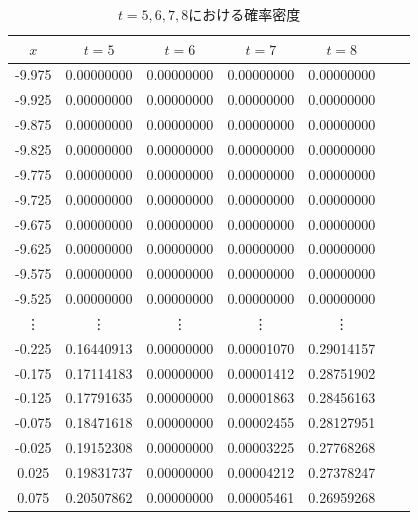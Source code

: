 \documentclass[a4j, titlepage]{jsarticle}
\numberwithin{equation}{section}
\begin{document}
            \begin{table}[h]
                \caption{$t=5,6,7,8$における確率密度}
                \label{tab:5678}
                \centering
                \begin{tabular}{ccccccc}
                    \hline
                    $x$ & $t = 5$ & $t = 6$ & $t = 7$ & $t = 8$
                    \\
                    \hline
                    \hline
                    -9.975 & 0.00000000 & 0.00000000 & 0.00000000 & 0.00000000 \\
                    -9.925 & 0.00000000 & 0.00000000 & 0.00000000 & 0.00000000 \\
                    -9.875 & 0.00000000 & 0.00000000 & 0.00000000 & 0.00000000 \\
                    -9.825 & 0.00000000 & 0.00000000 & 0.00000000 & 0.00000000 \\
                    -9.775 & 0.00000000 & 0.00000000 & 0.00000000 & 0.00000000 \\
                    -9.725 & 0.00000000 & 0.00000000 & 0.00000000 & 0.00000000 \\
                    -9.675 & 0.00000000 & 0.00000000 & 0.00000000 & 0.00000000 \\
                    -9.625 & 0.00000000 & 0.00000000 & 0.00000000 & 0.00000000 \\
                    -9.575 & 0.00000000 & 0.00000000 & 0.00000000 & 0.00000000 \\
                    -9.525 & 0.00000000 & 0.00000000 & 0.00000000 & 0.00000000 \\
                    \vdots & \vdots & \vdots & \vdots & \vdots \vspace{1mm} \\
                    -0.225 & 0.16440913 & 0.00000000 & 0.00001070 & 0.29014157 \\
                    -0.175 & 0.17114183 & 0.00000000 & 0.00001412 & 0.28751902 \\
                    -0.125 & 0.17791635 & 0.00000000 & 0.00001863 & 0.28456163 \\
                    -0.075 & 0.18471618 & 0.00000000 & 0.00002455 & 0.28127951 \\
                    -0.025 & 0.19152308 & 0.00000000 & 0.00003225 & 0.27768268 \\
                    0.025 & 0.19831737 & 0.00000000 & 0.00004212 & 0.27378247 \\
                    0.075 & 0.20507862 & 0.00000000 & 0.00005461 & 0.26959268 \\

\end{tabular}
\end{table}
\end{document}

